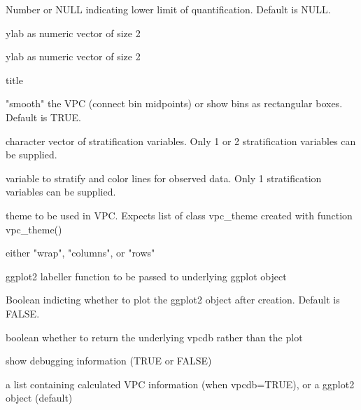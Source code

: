 \documentclass[letterpaper]{book}
\begin{document}
\begin{Arguments}
\begin{ldescription}
\item[\code{lloq}] Number or NULL indicating lower limit of quantification. Default is NULL.

\item[\code{xlab}] ylab as numeric vector of size 2

\item[\code{ylab}] ylab as numeric vector of size 2

\item[\code{title}] title

\item[\code{smooth}] "smooth" the VPC (connect bin midpoints) or show bins as rectangular boxes. Default is TRUE.

\item[\code{stratify}] character vector of stratification variables. Only 1 or 2 stratification variables can be supplied.

\item[\code{stratify\_color}] variable to stratify and color lines for observed data. Only 1 stratification variables can be supplied.

\item[\code{vpc\_theme}] theme to be used in VPC. Expects list of class vpc\_theme created with function vpc\_theme()

\item[\code{facet}] either "wrap", "columns", or "rows"

\item[\code{labeller}] ggplot2 labeller function to be passed to underlying ggplot object

\item[\code{plot}] Boolean indicting whether to plot the ggplot2 object after creation. Default is FALSE.

\item[\code{vpcdb}] boolean whether to return the underlying vpcdb rather than the plot

\item[\code{verbose}] show debugging information (TRUE or FALSE)
\end{ldescription}
\end{Arguments}
%
\begin{Value}
a list containing calculated VPC information (when vpcdb=TRUE), or a ggplot2 object (default)
\end{Value}
%
\begin{SeeAlso}\relax
{}
\end{SeeAlso}
\end{document}
